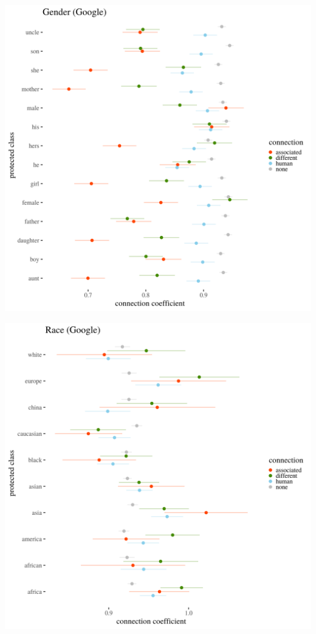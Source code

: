 \documentclass[
  12pt,
]{book}
\begin{document}
\includegraphics[width=14cm]{../images/visGenderGoogle.png}

\includegraphics[width=14cm]{../images/visRaceGoogle.png}
\end{document}
